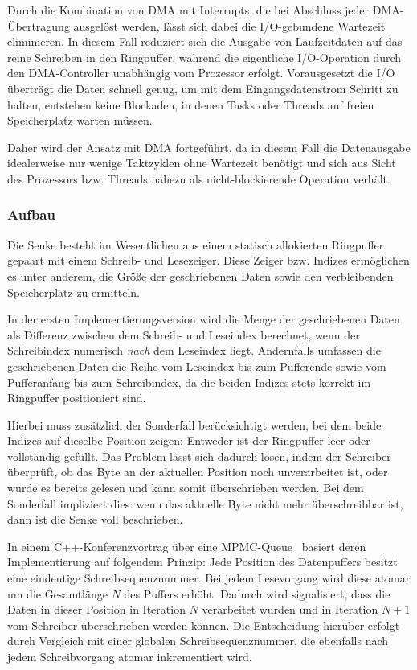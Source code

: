Durch die Kombination von DMA mit Interrupts, die bei Abschluss jeder
DMA-Übertragung ausgelöst werden, lässt sich dabei die I/O-gebundene Wartezeit
eliminieren. In diesem Fall reduziert sich die Ausgabe von Laufzeitdaten auf das
reine Schreiben in den Ringpuffer, während die eigentliche I/O-Operation durch
den DMA-Controller unabhängig vom Prozessor erfolgt. Vorausgesetzt die I/O
überträgt die Daten schnell genug, um mit dem Eingangsdatenstrom Schritt zu
halten, entstehen keine Blockaden, in denen Tasks oder Threads auf freien
Speicherplatz warten müssen.

Daher wird der Ansatz mit DMA fortgeführt, da in diesem Fall die Datenausgabe
idealerweise nur wenige Taktzyklen ohne Wartezeit benötigt und sich aus Sicht
des Prozessors bzw. Threads nahezu als nicht-blockierende Operation verhält.

\subsubsection{Aufbau}

Die Senke besteht im Wesentlichen aus einem statisch allokierten Ringpuffer
gepaart mit einem Schreib- und Lesezeiger. Diese Zeiger bzw. Indizes ermöglichen
es unter anderem, die Größe der geschriebenen Daten sowie den verbleibenden
Speicherplatz zu ermitteln.

In der ersten Implementierungsversion wird die Menge der geschriebenen Daten als
Differenz zwischen dem Schreib- und Leseindex berechnet, wenn der Schreibindex
numerisch \textit{nach} dem Leseindex liegt. Andernfalls umfassen die
geschriebenen Daten die Reihe vom Leseindex bis zum Pufferende sowie vom
Pufferanfang bis zum Schreibindex, da die beiden Indizes stets korrekt im
Ringpuffer positioniert sind.

Hierbei muss zusätzlich der Sonderfall berücksichtigt werden, bei dem beide
Indizes auf dieselbe Position zeigen: Entweder ist der Ringpuffer leer oder
vollständig gefüllt. Das Problem lässt sich dadurch lösen, indem der Schreiber
überprüft, ob das Byte an der aktuellen Position noch unverarbeitet ist, oder
wurde es bereits gelesen und kann somit überschrieben werden. Bei dem Sonderfall
impliziert dies: wenn das aktuelle Byte nicht mehr überschreibbar ist, dann ist
die Senke voll beschrieben.

In einem C++-Konferenzvortrag über eine
\ac{MPMC}-Queue~\cite{CppCon2024LockFreeQueue} basiert deren Implementierung auf
folgendem Prinzip: Jede Position des Datenpuffers besitzt eine eindeutige
Schreibsequenznummer. Bei jedem Lesevorgang wird diese atomar um die Gesamtlänge
$N$ des Puffers erhöht. Dadurch wird signalisiert, dass die Daten in dieser
Position in Iteration $N$ verarbeitet wurden und in Iteration $N+1$ vom
Schreiber überschrieben werden können. Die Entscheidung hierüber erfolgt durch
Vergleich mit einer globalen Schreibsequenznummer, die ebenfalls nach jedem
Schreibvorgang atomar inkrementiert wird.

